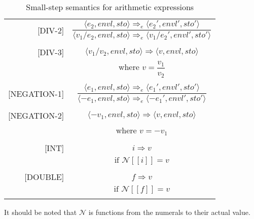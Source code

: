 \begin{longtable}[c] { r c }
  [DIV-2] & 
    \( \dfrac { \langle e_2, envl, sto \rangle \Rightarrow_e \langle e_2', envl', sto' \rangle }
      {\langle v_1 / e_2, envl, sto \rangle \Rightarrow_e \langle v_1 / e_2', envl', sto' \rangle } \) \\
  & \\

  [DIV-3] & 
    \( \langle v_1 / v_2, envl, sto \rangle \Rightarrow \langle v, envl, sto \rangle \) \\
  & where \( v = \dfrac{ v_1 }{ v_2 } \) \\
  & \\

  [NEGATION-1] & 
    \( \dfrac { \langle e_1, envl, sto \rangle \Rightarrow_e \langle e_1', envl', sto' \rangle }
      {\langle -e_1, envl, sto \rangle \Rightarrow_e \langle -e_1', envl', sto' \rangle } \) \\
  & \\

  [NEGATION-2] & 
    \( \langle -v_1, envl, sto \rangle \Rightarrow \langle v, envl, sto \rangle \) \\
  & where \( v = -v_1 \)\\
  & \\

  [INT] & 
    \( i \Rightarrow v \) \\
  & \( \text{if } \mathcal{N} [[i]] = v \) \\
  & \\
  
  [DOUBLE] & 
    \( f \Rightarrow v \) \\
  & \( \text{if } \mathcal{N} [[f]] = v \) \\

  \caption{Small-step semantics for arithmetic expressions}
\end{longtable}
It should be noted that \( \mathcal{N} \) is functions from the numerals to their actual value.

